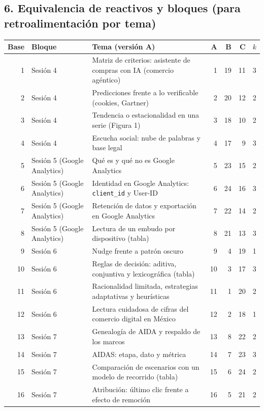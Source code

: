 \documentclass[10pt,letterpaper]{article}
\begin{document}
\subsection*{6. Equivalencia de reactivos y bloques (para retroalimentación por tema)}
\begin{center}\footnotesize\begin{longtable}{@{}rllrrrc@{}}\toprule Base & Bloque & Tema (versión A) & A & B & C & $k$\\\midrule\endhead
1 & Sesión 4 & Matriz de criterios: asistente de compras con IA (comercio agéntico) & 1 & 19 & 11 & 3\\
2 & Sesión 4 & Predicciones frente a lo verificable (cookies, Gartner) & 2 & 20 & 12 & 2\\
3 & Sesión 4 & Tendencia o estacionalidad en una serie (Figura 1) & 3 & 18 & 10 & 2\\
4 & Sesión 4 & Escucha social: nube de palabras y base legal & 4 & 17 & 9 & 3\\
5 & Sesión 5 (Google Analytics) & Qué es y qué no es Google Analytics & 5 & 23 & 15 & 2\\
6 & Sesión 5 (Google Analytics) & Identidad en Google Analytics: \texttt{client\_id} y User-ID & 6 & 24 & 16 & 3\\
7 & Sesión 5 (Google Analytics) & Retención de datos y exportación en Google Analytics & 7 & 22 & 14 & 2\\
8 & Sesión 5 (Google Analytics) & Lectura de un embudo por dispositivo (tabla) & 8 & 21 & 13 & 3\\
9 & Sesión 6 & Nudge frente a patrón oscuro & 9 & 4 & 19 & 1\\
10 & Sesión 6 & Reglas de decisión: aditiva, conjuntiva y lexicográfica (tabla) & 10 & 3 & 17 & 3\\
11 & Sesión 6 & Racionalidad limitada, estrategias adaptativas y heurísticas & 11 & 1 & 20 & 2\\
12 & Sesión 6 & Lectura cuidadosa de cifras del comercio digital en México & 12 & 2 & 18 & 1\\
13 & Sesión 7 & Genealogía de AIDA y respaldo de los marcos & 13 & 8 & 22 & 2\\
14 & Sesión 7 & AIDAS: etapa, dato y métrica & 14 & 7 & 23 & 3\\
15 & Sesión 7 & Comparación de escenarios con un modelo de recorrido (tabla) & 15 & 6 & 24 & 2\\
16 & Sesión 7 & Atribución: último clic frente a efecto de remoción & 16 & 5 & 21 & 2\\

\end{longtable}
\end{center}
\end{document}
